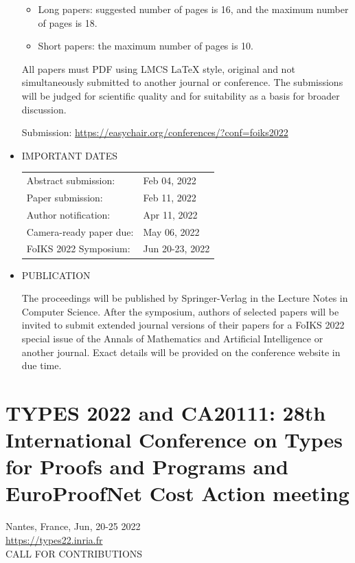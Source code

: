 \documentclass[prodmode,acmtecs]{acmsmall} %
\begin{document}
\begin{itemize}
\begin{itemize}\item  Long papers: suggested number of pages is 16, and the maximum number of pages is 18. 
\item  Short papers: the maximum number of pages is 10. 
\end{itemize} 
  All papers must PDF using LMCS LaTeX style, original and not simultaneously submitted to another journal or conference.  The submissions will be judged for scientific quality and for suitability as a basis for broader discussion. 
 
  Submission: \href{https://easychair.org/conferences/?conf=foiks2022}{https://easychair.org/conferences/?conf=foiks2022}  
 
\item  IMPORTANT DATES 
 
\begin{tabulary}{\linewidth}{LL}Abstract submission:  & Feb 04, 2022 \\
Paper submission:  & Feb 11, 2022 \\
Author notification:  & Apr 11, 2022 \\
Camera-ready paper due:  & May 06, 2022 \\
FoIKS 2022 Symposium:  & Jun 20-23, 2022 \\
\end{tabulary}
 
\item  PUBLICATION 
 
  The proceedings will be published by Springer-Verlag in the Lecture Notes in Computer Science. After the symposium, authors of selected papers will be invited to submit extended journal versions of their papers for a FoIKS 2022 special issue of the Annals of Mathematics and Artificial Intelligence or another journal. Exact details will be provided on the conference website in due time. 
 
\end{itemize}\section{TYPES 2022 and CA20111: 28th International Conference on Types for Proofs and Programs and EuroProofNet Cost Action meeting}\label{TYPES2022andCA20111}  Nantes, France,  Jun, 20-25 2022\\ 
  \href{https://types22.inria.fr}{https://types22.inria.fr}\\ 
CALL FOR CONTRIBUTIONS 
\end{document}
